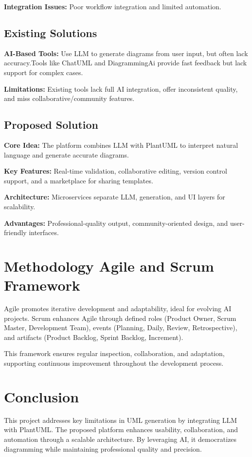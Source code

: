 \textbf{Integration Issues:} Poor workflow integration and limited automation.

\subsection{Existing Solutions}

\textbf{AI-Based Tools:} Use LLM to generate diagrams from user input, but often lack accuracy.Tools like ChatUML\cite{1} and DiagrammingAi\cite{2} provide fast feedback but lack support for complex cases.

\textbf{Limitations:} Existing tools lack full AI integration, offer inconsistent quality, and miss collaborative/community features.

\subsection{Proposed Solution}

\textbf{Core Idea:} The platform combines LLM with PlantUML to interpret natural language and generate accurate diagrams.

\textbf{Key Features:} Real-time validation, collaborative editing, version control support, and a marketplace for sharing templates.

\textbf{Architecture:} Microservices separate LLM, generation, and UI layers for scalability.

\textbf{Advantages:} Professional-quality output, community-oriented design, and user-friendly interfaces.


\section{Methodology Agile and Scrum Framework}

Agile promotes iterative development and adaptability, ideal for evolving AI projects. Scrum enhances Agile through defined roles (Product Owner, Scrum Master, Development Team), events (Planning, Daily, Review, Retrospective), and artifacts (Product Backlog, Sprint Backlog, Increment).

This framework ensures regular inspection, collaboration, and adaptation, supporting continuous improvement throughout the development process.


\section{Conclusion}
This project addresses key limitations in UML generation by integrating LLM with PlantUML.
The proposed platform enhances usability, collaboration, and automation through a scalable architecture.
By leveraging AI, it democratizes diagramming while maintaining professional quality and precision.
